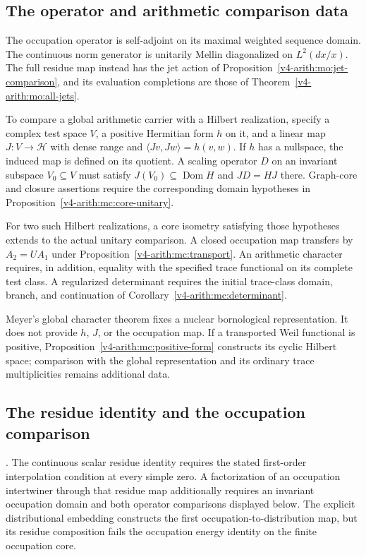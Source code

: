 \subsection{The operator and arithmetic comparison data}
\label{v4-arith:w9-r4:residual:table}

The occupation operator is self-adjoint on its maximal weighted
sequence domain. The continuous norm generator is unitarily Mellin
diagonalized on $L^2(dx/x)$. The full residue map instead has the
jet action of Proposition~\ref{v4-arith:mo:jet-comparison}, and its
evaluation completions are those of
Theorem~\ref{v4-arith:mo:all-jets}.

To compare a global arithmetic carrier with a Hilbert realization,
specify a complex test space $V$, a positive Hermitian form $h$ on it,
and a linear map $J:V\to\mathcal H$ with dense range and
$\langle Jv,Jw\rangle=h(v,w)$. If $h$ has a nullspace, the induced
map is defined on its quotient. A scaling operator $D$ on an invariant
subspace $V_0\subseteq V$ must satisfy
$J(V_0)\subseteq\operatorname{Dom}H$ and $JD=HJ$ there.
Graph-core and closure assertions require the corresponding domain
hypotheses in Proposition~\ref{v4-arith:mc:core-unitary}.

For two such Hilbert realizations, a core isometry satisfying those
hypotheses extends to the actual unitary comparison. A closed
occupation map transfers by $A_2=UA_1$ under
Proposition~\ref{v4-arith:mc:transport}. An arithmetic character
requires, in addition, equality with the specified trace functional
on its complete test class. A regularized determinant requires the
initial trace-class domain, branch, and continuation of
Corollary~\ref{v4-arith:mc:determinant}.

Meyer's global character theorem fixes a nuclear bornological
representation. It does not provide $h$, $J$, or the occupation map.
If a transported Weil functional is positive,
Proposition~\ref{v4-arith:mc:positive-form} constructs its cyclic
Hilbert space; comparison with the global representation and its
ordinary trace multiplicities remains additional data.

\subsection{The residue identity and the occupation comparison}
\label{v4-arith:w9-r4:residual:why-irreducible}

\begin{theorem}
\label{v4-arith:w9-r4:thm:irreducibility}
\ClaimStatusProvedHere. The continuous scalar residue identity
requires the stated first-order interpolation condition at every
simple zero. A factorization of an occupation intertwiner through
that residue map additionally requires an invariant occupation
domain and both operator comparisons displayed below.
The explicit distributional embedding constructs the first
occupation-to-distribution map, but its residue composition fails
the occupation energy identity on the finite occupation core.
\end{theorem}

